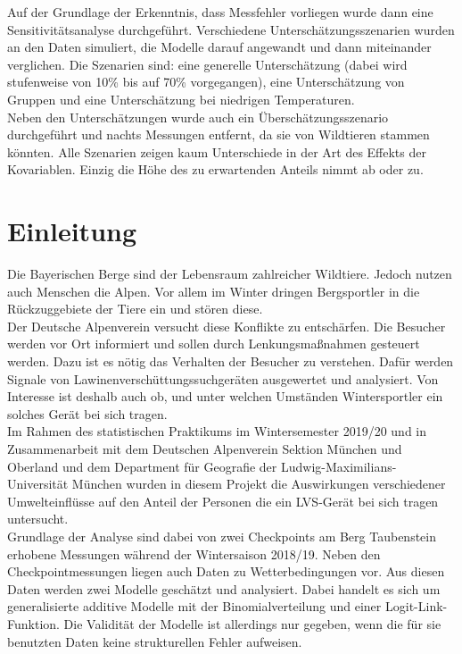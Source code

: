 \documentclass[12pt]{scrreprt}
\begin{document}
Auf der Grundlage der Erkenntnis, dass Messfehler vorliegen wurde dann eine Sensitivitätsanalyse durchgeführt. Verschiedene Unterschätzungsszenarien wurden an den Daten simuliert, die Modelle darauf angewandt und dann miteinander verglichen. Die Szenarien sind: eine generelle Unterschätzung (dabei wird stufenweise von 10\% bis auf 70\% vorgegangen), eine Unterschätzung von Gruppen und eine Unterschätzung bei niedrigen Temperaturen. \\
Neben den Unterschätzungen wurde auch ein Überschätzungsszenario durchgeführt und nachts Messungen entfernt, da sie von Wildtieren stammen könnten. Alle Szenarien zeigen kaum Unterschiede in der Art des Effekts der Kovariablen. Einzig die Höhe des zu erwartenden Anteils nimmt ab oder zu.


\chapter{Einleitung}
Die Bayerischen Berge sind der Lebensraum zahlreicher Wildtiere. Jedoch nutzen auch Menschen die Alpen. Vor allem im Winter dringen Bergsportler in die Rückzuggebiete der Tiere ein und stören diese. \\
Der Deutsche Alpenverein versucht diese Konflikte zu entschärfen. Die Besucher werden vor Ort informiert und sollen durch Lenkungsmaßnahmen gesteuert werden. Dazu ist es nötig das Verhalten der Besucher zu verstehen. Dafür werden Signale von Lawinenverschüttungssuchgeräten ausgewertet und analysiert. Von Interesse ist deshalb auch ob, und unter welchen Umständen Wintersportler ein solches Gerät bei sich tragen. \\
Im Rahmen des statistischen Praktikums im Wintersemester 2019/20 und in Zusammenarbeit mit dem Deutschen Alpenverein Sektion München und Oberland und dem Department für Geografie der Ludwig-Maximilians-Universität München wurden in diesem Projekt die Auswirkungen verschiedener Umwelteinflüsse auf den Anteil der Personen die ein LVS-Gerät bei sich tragen untersucht. \\
Grundlage der Analyse sind dabei von zwei Checkpoints am Berg Taubenstein erhobene Messungen während der Wintersaison 2018/19. Neben den Checkpointmessungen liegen auch Daten zu Wetterbedingungen vor. Aus diesen Daten werden zwei Modelle geschätzt und analysiert. Dabei handelt es sich um generalisierte additive Modelle mit der Binomialverteilung und einer Logit-Link-Funktion. Die Validität der Modelle ist allerdings nur gegeben, wenn die für sie benutzten Daten keine strukturellen Fehler aufweisen. \\
\end{document}
